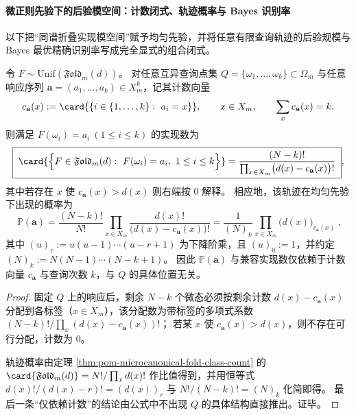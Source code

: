\paragraph{微正则先验下的后验模空间：计数闭式、轨迹概率与 Bayes 识别率}
以下把“同谱折叠实现模空间”赋予均匀先验，并将任意有限查询轨迹的后验规模与 Bayes 最优精确识别率写成完全显式的组合闭式。

\begin{theorem}[后验模空间的精确计数与轨迹概率]\label{thm:pom-microcanonical-fold-posterior-count-and-prob}
令 \(F\sim\mathrm{Unif}(\mathfrak{Fold}_m(d))\)。
对任意互异查询点集 \(Q=\{\omega_1,\dots,\omega_k\}\subset\Omega_m\) 与任意响应序列 \(\mathbf{a}=(a_1,\dots,a_k)\in X_m^k\)，记其计数向量
\[
c_{\mathbf{a}}(x):=\card{\{i\in\{1,\dots,k\}:\ a_i=x\}},\qquad x\in X_m,\qquad \sum_{x}c_{\mathbf{a}}(x)=k.
\]
则满足 \(F(\omega_i)=a_i\ (1\le i\le k)\) 的实现数为
\[
\boxed{\;
\card{\Bigl\{F\in\mathfrak{Fold}_m(d):\ F(\omega_i)=a_i,\ 1\le i\le k\Bigr\}}
=\frac{(N-k)!}{\prod_{x\in X_m}\bigl(d(x)-c_{\mathbf{a}}(x)\bigr)!}\;},
\]
其中若存在 \(x\) 使 \(c_{\mathbf{a}}(x)>d(x)\) 则右端按 \(0\) 解释。
相应地，该轨迹在均匀先验下出现的概率为
\[
\boxed{\;
\mathbb{P}(\mathbf{a})
=\frac{(N-k)!}{N!}\prod_{x\in X_m}\frac{d(x)!}{\bigl(d(x)-c_{\mathbf{a}}(x)\bigr)!}
=\frac{1}{(N)_k}\prod_{x\in X_m}\bigl(d(x)\bigr)_{c_{\mathbf{a}}(x)}\;},
\]
其中 \((u)_r:=u(u-1)\cdots(u-r+1)\) 为下降阶乘，且 \((u)_0:=1\)，并约定 \((N)_k:=N(N-1)\cdots(N-k+1)\)。
因此 \(\mathbb{P}(\mathbf{a})\) 与兼容实现数仅依赖于计数向量 \(c_{\mathbf{a}}\) 与查询次数 \(k\)，与 \(Q\) 的具体位置无关。
\end{theorem}
\begin{proof}
固定 \(Q\) 上的响应后，剩余 \(N-k\) 个微态必须按剩余计数
\(
d(x)-c_{\mathbf{a}}(x)
\)
分配到各标签（\(x\in X_m\)），该分配数为带标签的多项式系数
\(
(N-k)!/\prod_x(d(x)-c_{\mathbf{a}}(x))!
\)；
若某 \(x\) 使 \(c_{\mathbf{a}}(x)>d(x)\)，则不存在可行分配，计数为 \(0\)。
\par
轨迹概率由定理 \ref{thm:pom-microcanonical-fold-class-count} 的
\(
\card{\mathfrak{Fold}_m(d)}=N!/\prod_x d(x)!
\)
作比值得到，并用恒等式
\(
d(x)!/(d(x)-r)!= (d(x))_{r}
\)
与
\(
N!/(N-k)!=(N)_k
\)
化简即得。
最后一条“仅依赖计数”的结论由公式中不出现 \(Q\) 的具体结构直接推出。证毕。
\end{proof}



